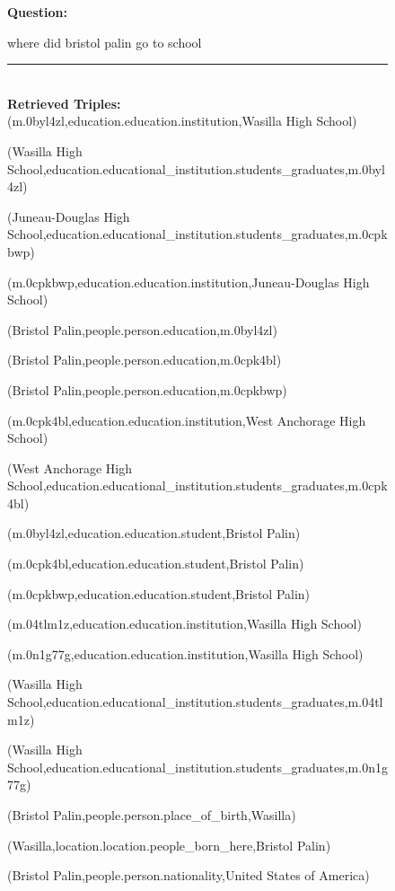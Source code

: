 \begin{figure}
\begin{tcolorbox}[colback=gray!5!white, colframe=gray!75!black, title=WebQSP-WebQTest-188]
\scriptsize

\textbf{Question:}\\
\raggedright where did bristol palin go to school

\rule{\linewidth}{0.4pt}
\\

\textbf{Retrieved Triples:}\\
(m.0byl4zl,education.education.institution,Wasilla High School)

(Wasilla High School,education.educational\_institution.students\_graduates,m.0byl4zl)

(Juneau-Douglas High School,education.educational\_institution.students\_graduates,m.0cpkbwp)

(m.0cpkbwp,education.education.institution,Juneau-Douglas High School)

(Bristol Palin,people.person.education,m.0byl4zl)

(Bristol Palin,people.person.education,m.0cpk4bl)

(Bristol Palin,people.person.education,m.0cpkbwp)

(m.0cpk4bl,education.education.institution,West Anchorage High School)

(West Anchorage High School,education.educational\_institution.students\_graduates,m.0cpk4bl)

(m.0byl4zl,education.education.student,Bristol Palin)

(m.0cpk4bl,education.education.student,Bristol Palin)

(m.0cpkbwp,education.education.student,Bristol Palin)

(m.04tlm1z,education.education.institution,Wasilla High School)

(m.0n1g77g,education.education.institution,Wasilla High School)

(Wasilla High School,education.educational\_institution.students\_graduates,m.04tlm1z)

(Wasilla High School,education.educational\_institution.students\_graduates,m.0n1g77g)

(Bristol Palin,people.person.place\_of\_birth,Wasilla)

(Wasilla,location.location.people\_born\_here,Bristol Palin)

(Bristol Palin,people.person.nationality,United States of America)


\end{tcolorbox}
\end{figure}
